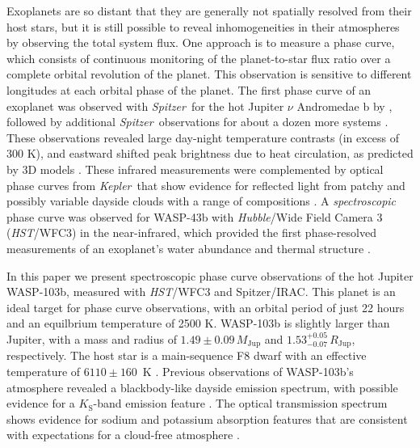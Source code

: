 \documentclass[twocolumn, trackchanges]{aastex61}
\newcommand{\project}[1]{\textsl{#1}}
\newcommand{\HST}{\project{HST}}
\newcommand{\Spitzer}{\project{Spitzer}}
\newcommand{\Kepler}{\project{Kepler}}
\begin{document}
Exoplanets are so distant that they are generally not spatially resolved from their host stars, but it is still possible to reveal inhomogeneities in their atmospheres by observing the total system flux. One approach is to measure a phase curve, which consists of continuous monitoring of the planet-to-star flux ratio over a complete orbital revolution of the planet. This observation is sensitive to different longitudes at each orbital phase of the planet.  The first phase curve of an exoplanet was observed with \Spitzer\ for the hot Jupiter $\nu$ Andromedae b by \cite{harrington06}, followed by additional \Spitzer\ observations for about a dozen more systems \citep[cataloged in][]{parmentier17}.  These observations revealed large day-night temperature contrasts (in excess of 300 K), and eastward shifted peak brightness due to heat circulation, as predicted by 3D models \citep{showman02}.  These infrared measurements were complemented by optical phase curves from \Kepler\ that show evidence for reflected light from patchy and possibly variable dayside clouds with a range of compositions \citep{borucki09, demory13, hu15, armstrong16, parmentier16}. A \emph{spectroscopic} phase curve was observed for WASP-43b with \emph{Hubble}/Wide Field Camera 3 (\HST/WFC3) in the near-infrared, which provided the first phase-resolved measurements of an exoplanet's water abundance and thermal structure \citep{stevenson14, stevenson17}.

In this paper we present spectroscopic phase curve observations of the hot
Jupiter WASP-103b, measured with \HST/WFC3 and Spitzer/IRAC. This planet is an
ideal target for phase curve observations, with an orbital period of just 22
hours and an equilbrium temperature of 2500 K.  WASP-103b is slightly
larger than Jupiter, with a mass and radius of $1.49\pm0.09\,M_\mathrm{Jup}$ and
$1.53^{+0.05}_{-0.07}\,R_\mathrm{Jup}$, respectively. The host star is a main-sequence F8 dwarf with an effective temperature of $6110 \pm 160\,$ K \citep{gillon14}. Previous observations of WASP-103b's atmosphere revealed a blackbody-like dayside emission spectrum, with possible evidence for a $K_\mathrm{S}$-band emission feature \citep{cartier17, delrez18}. The optical transmission spectrum shows evidence for sodium and potassium absorption features that are consistent with expectations for a cloud-free atmosphere \citep{lendl17}.%
\end{document}
